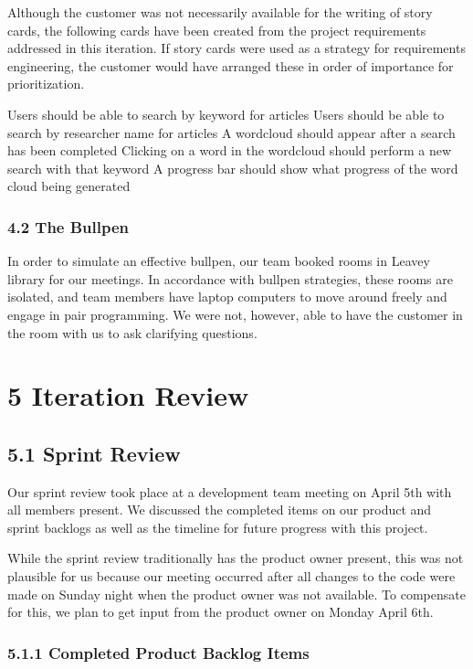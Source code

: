 \documentclass[]{article}
\begin{document}
Although the customer was not necessarily available for the writing of
story cards, the following cards have been created from the project
requirements addressed in this iteration. If story cards were used as a
strategy for requirements engineering, the customer would have arranged
these in order of importance for prioritization.

Users should be able to search by keyword for articles Users should be
able to search by researcher name for articles A wordcloud should appear
after a search has been completed Clicking on a word in the wordcloud
should perform a new search with that keyword A progress bar should show
what progress of the word cloud being generated

\subsubsection{4.2 The Bullpen}\label{the-bullpen}

In order to simulate an effective bullpen, our team booked rooms in
Leavey library for our meetings. In accordance with bullpen strategies,
these rooms are isolated, and team members have laptop computers to move
around freely and engage in pair programming. We were not, however, able
to have the customer in the room with us to ask clarifying questions.

\section{5 Iteration Review}\label{iteration-review}

\subsection{5.1 Sprint Review}\label{sprint-review}

Our sprint review took place at a development team meeting on April 5th
with all members present. We discussed the completed items on our
product and sprint backlogs as well as the timeline for future progress
with this project.

While the sprint review traditionally has the product owner present,
this was not plausible for us because our meeting occurred after all
changes to the code were made on Sunday night when the product owner was
not available. To compensate for this, we plan to get input from the
product owner on Monday April 6th.

\subsubsection{5.1.1 Completed Product Backlog
Items}\label{completed-product-backlog-items}
\end{document}
